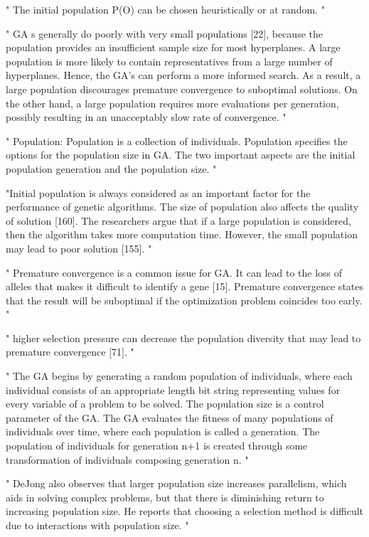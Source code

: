 "
The initial population P(O) can be chosen heuristically or at random.
"\cite{grefenstette_optimization_1986}

"
GA s generally do poorly with very small populations [22], because the population provides an insufficient sample size for most hyperplanes. A large population is more likely to contain representatives from a large number of hyperplanes. Hence, the GA's can perform a more informed search. As a result, a large population discourages premature convergence to suboptimal solutions. On the other hand, a large population requires more evaluations per generation, possibly resulting in an unacceptably slow rate of convergence.
"\cite{grefenstette_optimization_1986}


"
Population: Population is a collection of individuals. Population specifies the options for the population size in GA. The two important aspects are the initial population generation and the population size.
"\cite{majumdar_genetic_2015}


"Initial population is always considered as an important factor for the performance of genetic algorithms. The size of population also affects the quality of solution [160]. The researchers argue that if a large population is considered, then the algorithm takes more computation time. However, the small population may lead to poor solution [155].
"\cite{katoch_review_2021}

"
Premature convergence is a common issue for GA. It can lead to the loss of alleles that makes it difficult to identify a gene [15]. Premature convergence states that the result will be suboptimal if the optimization problem coincides too early.
"\cite{katoch_review_2021}

"
higher selection pressure can decrease the population diversity that may lead to premature convergence [71].
"\cite{katoch_review_2021}


"
The GA begins by generating a random population of individuals, where each individual consists of an appropriate length bit string representing values for every variable of a problem to be solved. The population size is a control parameter of the GA. The GA evaluates the fitness of many populations of individuals over time, where each population is called a generation. The population of individuals for generation n+1 is created through some transformation of individuals composing generation n.
"\cite{mills_determining_2015}

"
DeJong also observes that larger population size increases parallelism, which aids in solving complex problems, but that there is diminishing return to increasing population size. He reports that choosing a selection method is difficult due to interactions with population size.
"\cite{mills_determining_2015}



